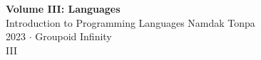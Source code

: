 \documentclass{article}
\begin{document}
\begin{titlepage}
    \centering
    \vspace*{1in}
    \Huge
    \textbf{Volume III: Languages} \\
    \vspace{0.5in}
    \LARGE
    Introduction to Programming Languages
    \vfill
    \large
    Namdak Tonpa \\
    \vspace{0.1in}
    \Large
    2023 $\cdot$ Groupoid Infinity \\
    \vspace{0.5in}
    III
\end{titlepage}

\tableofcontents
\newif\ifincludeTOC
\includeTOCfalse
\newpage \begin{standalone}     \end{standalone} %
\newpage \begin{standalone}   \end{standalone} %
\newpage \begin{standalone}  \end{standalone} %
\newpage \begin{standalone}  \end{standalone}     %
\end{document}
